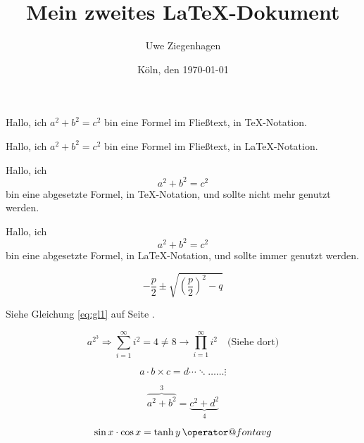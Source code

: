 \documentclass[12pt,ngerman,parskip=half]{scrartcl}
\author{Uwe Ziegenhagen}
\title{Mein zweites \LaTeX-Dokument}
\date{Köln, den \today}
\makeatletter
\newcommand{\avg}{\mathop{\operator@font avg}}
\makeatother
\begin{document}
Hallo, ich $a^2+b^2=c^2$ bin eine Formel im Fließtext, in \TeX-Notation.

Hallo, ich \(a^2+b^2=c^2\) bin eine Formel im Fließtext, in \LaTeX-Notation.

Hallo, ich $$a^2+b^2=c^2$$ bin eine abgesetzte Formel, in \TeX-Notation, und sollte nicht mehr genutzt werden.

Hallo, ich \[a^2+b^2=c^2\] bin eine abgesetzte Formel, in \LaTeX-Notation, und sollte immer genutzt werden.

\begin{equation}\label{eq:gl1}%
-\frac{p}{2} \pm \sqrt{
\left(\frac{p}{2}\right)
^2 - q}
\end{equation}

Siehe Gleichung \ref{eq:gl1} auf Seite \pageref{eq:gl1}.

\begin{equation}
a^{2^3} \Rightarrow \sum_{i=1}^{\infty} i^2 = 4 \not=8 \rightarrow \prod_{i=1}^{\infty} i^2 \quad\mbox{(Siehe dort)}
\end{equation}


\begin{equation}
a \cdot b \times c = d \cdots \ddots \ldots \dots \vdots
\end{equation}

\begin{equation}
\overbrace{a^2+b^2}^3 = \underbrace{c^2 + d^2}_4
\end{equation}

\begin{equation}
\sin x \cdot \cos x = \tanh y \avg
\end{equation}
\end{document}
